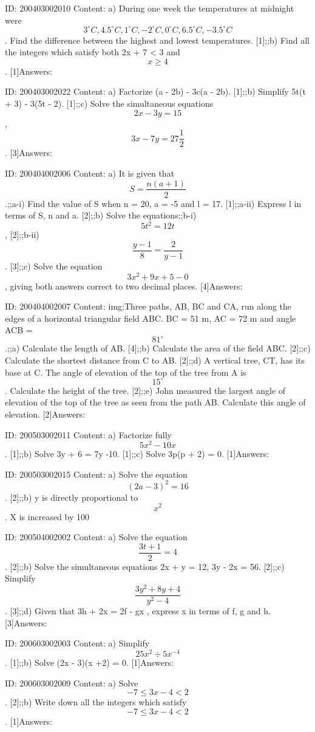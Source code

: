 \documentclass{article}
\begin{document}
ID: 200403002010
Content:
a) During one week the temperatures at midnight were $$3^{\circ}C, 4.5^{\circ}C, 1^{\circ}C, -2^{\circ}C, 0^{\circ}C, 6.5^{\circ}C, -3.5^{\circ}C$$. Find the difference between the highest and lowest temperatures. [1];;b) Find all the integers which satisfy both 2x + 7 < 3 and $$x  \geq  4$$. [1]Answers:

ID: 200403002022
Content:
a) Factorize (a - 2b) - 3c(a - 2b). [1];;b) Simplify 5t(t + 3) - 3(5t - 2). [1];;c) Solve the simultaneous equations $$2x - 3y = 15$$, $$3x-7y=27\frac{1}{2}$$. [3]Answers:

ID: 200404002006
Content:
a) It is given that $$S=\frac{n(a+1)}{2}$$.;;a-i) Find the value of S when n = 20, a = -5 and l = 17. [1];;a-ii) Express l in terms of S, n and a. [2];;b) Solve the equations;;b-i) $$5t^{2} =12t$$, [2];;b-ii) $$\frac{y-1}{8}=\frac{2}{y-1}$$. [3];;c) Solve the equation $$3x^{2} +9x+5-0$$, giving both answers correct to two decimal places. [4]Answers:

ID: 200404002007
Content:
img;Three paths, AB, BC and CA, run along the edges of a horizontal triangular field ABC. BC = 51 m, AC = 72 m and angle ACB = $$81^{\circ}$$.;;a) Calculate the length of AB. [4];;b) Calculate the area of the field ABC. [2];;c) Calculate the shortest distance from C to AB. [2];;d) A vertical tree, CT, has its base at C. The angle of elevation of the top of the tree from A is $$15^{\circ}$$. Calculate the height of the tree. [2];;e) John measured the largest angle of elevation of the top of the tree as seen from the path AB. Calculate this angle of elevation. [2]Answers:

ID: 200503002011
Content:
a) Factorize fully $$5x^{2} -10x$$. [1];;b) Solve 3y + 6 = 7y -10. [1];;c) Solve 3p(p + 2) = 0. [1]Answers:

ID: 200503002015
Content:
a) Solve the equation $$(2a-3)^{2} =16$$. [2];;b) y is directly proportional to $$x^{2} $$. X is increased by 100%

ID: 200504002002
Content:
a) Solve the equation $$\frac{3t+1}{2}=4$$. [2];;b) Solve the simultaneous equations 2x + y = 12, 3y - 2x = 56. [2];;c) Simplify $$\frac{3y^{2} +8y+4}{y^{2} -4}$$. [3];;d) Given that 3h + 2x = 2f - gx , express x in terms of f, g and h. [3]Answers:

ID: 200603002003
Content:
a) Simplify $$25x^{2} \div 5x^{-4}$$. [1];;b) Solve (2x - 3)(x +2) = 0. [1]Answers:

ID: 200603002009
Content:
a) Solve $$-7\leq 3x-4<2$$. [2];;b) Write down all the integers which satisfy $$-7\leq 3x-4<2$$. [1]Answers:
\end{document}
